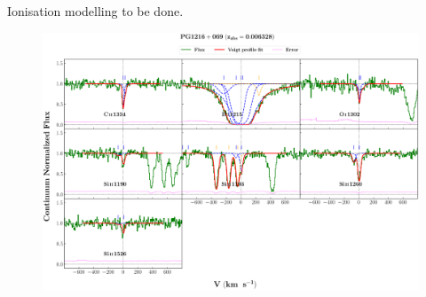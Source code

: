 \documentclass[12pt,draft]{report}
\begin{document}
Ionisation modelling to be done.


\newpage

\begin{landscape}

\begin{figure}
    \centering
    \vspace{-20mm}
    \hspace*{-35mm}
    \includegraphics[width=1.25\linewidth]{System-Plots/PG1216+069_z=0.006328_sys_plot.png}
\end{figure}

\end{landscape}
\end{document}
